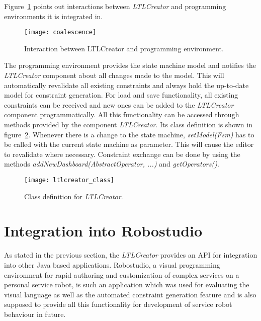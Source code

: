 Figure~\ref{fig:coalescence} points out interactions between \emph{LTLCreator} and programming environments it is integrated in.
\begin{figure}[htbp]
  \centering
  \texttt{[image: coalescence]}
  \caption{Interaction between LTLCreator and programming environment.}
  \label{fig:coalescence}
\end{figure}
The programming environment provides the state machine model and notifies the \emph{LTLCreator} component about all changes made to the model. This will automatically revalidate all existing constraints and always hold the up-to-date model for constraint generation.
For load and save functionality, all existing constraints can be received and new ones can be added to the \emph{LTLCreator} component programmatically.
All this functionality can be accessed through methods provided by the component \emph{LTLCreator}. Its class definition is shown in figure~\ref{fig:ltlcreator_class}. Whenever there is a change to the state machine, \emph{setModel(Fsm)} has to be called with the current state machine as parameter. This will cause the editor to revalidate where necessary. Constraint exchange can be done by using the methods \emph{addNewDashboard(AbstractOperator, ...)} and \emph{getOperators()}.

\begin{figure}[htbp]
  \centering
  \texttt{[image: ltlcreator\_class]}
  \caption{Class definition for \emph{LTLCreator}.}
  \label{fig:ltlcreator_class}
\end{figure}







\section{Integration into Robostudio}
\label{sec:integrationintorobostudio}

As stated in the previous section, the \emph{LTLCreator} provides an API for integration into other Java based applications. Robostudio,
a visual programming environment for rapid authoring and customization of complex services on a personal service robot, is such an application which was used for evaluating the visual language as well as the automated constraint generation feature and is also supposed to provide all this functionality for development of service robot behaviour in future.

